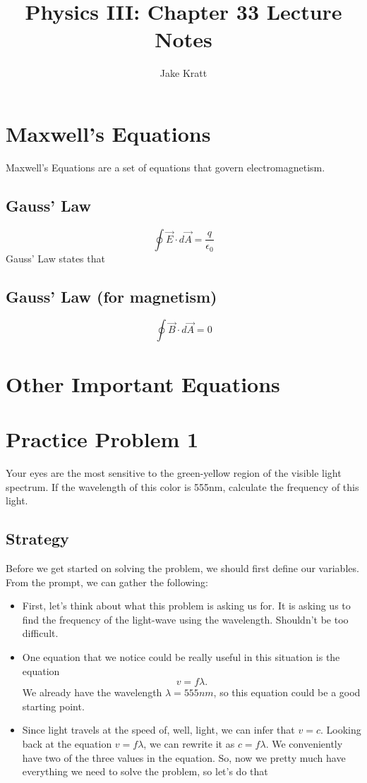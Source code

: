 \documentclass[12pt]{article}
\title{Physics III: Chapter 33 Lecture Notes}
\author{Jake Kratt}
\begin{document}
\maketitle

\section*{Maxwell's Equations}
Maxwell's Equations are a set of equations that govern electromagnetism.
\subsection*{Gauss' Law}
    \[\oint \vec{E}\cdot  d\vec{A} = \frac{q}{\epsilon_{0}}\]
Gauss' Law states that

\subsection*{Gauss' Law (for magnetism)}
\[\oint \vec{B} \cdot d\vec{A}=0\]

\section*{Other Important Equations}


\section*{Practice Problem 1}
Your eyes are the most sensitive to the green-yellow region of the visible light spectrum. If the wavelength of this color is 555nm, calculate the frequency of this light.
\subsection*{Strategy}
Before we get started on solving the problem, we should first define our variables. From the prompt, we can gather the following:
\begin{itemize}
    \item First, let's think about what this problem is asking us for. It is asking us to find the frequency of the light-wave using the wavelength. Shouldn't be too difficult.
    \item One equation that we notice could be really useful in this situation is the equation \[v=f \lambda. \] We already have the wavelength \(\lambda = 555nm\), so this equation could be a good starting point.
    \item Since light travels at the speed of, well, light, we can infer that \(v=c\). Looking back at the equation \(v=f \lambda \), we can rewrite it as \(c = f \lambda\). We conveniently have two of the three values in the equation. So, now we pretty much have everything we need to solve the problem, so let's do that
\end{itemize}
\end{document}
